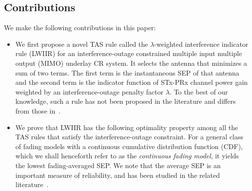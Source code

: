 \documentclass[12pt,draftcls,peerreview,onecolumn]{IEEEtran}
\newcommand{\lam}{\lambda}
\begin{document}
\subsection{Contributions} 
We make the following contributions in this paper:
\begin{itemize}
\item We first propose a novel TAS rule called the $\lam$-weighted interference indicator rule (LWIIR) for an interference-outage constrained multiple input multiple output (MIMO) underlay CR system. It selects the antenna that minimizes a sum of two terms. The first term is the instantaneous SEP of that antenna and the second term is the indicator function of STx-PRx channel power gain weighted by an interference-outage penalty factor $\lam$. To the best of our knowledge, such a rule has not been proposed in the literature and differs from those in~\cite{Wang_2011_TCom,Dmochowski_2011_CROWNCOM,Wang_2010_TWC}.

\item We prove that LWIIR has the following optimality property among all the TAS rules that satisfy the interference-outage constraint.  For a general class of fading models with a continuous cumulative distribution function (CDF), which we shall henceforth refer to as the {\em continuous fading model}, it yields the lowest fading-averaged SEP. We note that the average SEP is an important measure of reliability, and has been studied in the related literature~\cite{Kashyap_2014_TCOM,Sarvendranath_2013_TCOM,Sarvendranath_2014_TCOM,li_2011_pimrc}. 


\end{itemize}
\end{document}
